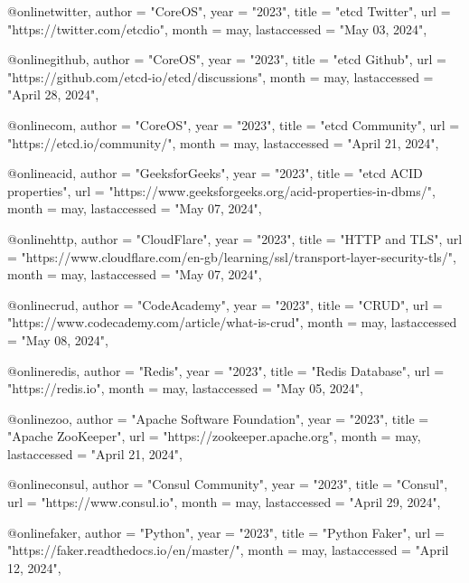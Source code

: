 @online{twitter,
  author =       "CoreOS",
  year =         "2023",
  title =        "etcd Twitter",
  url =          "https://twitter.com/etcdio",
  month =        may,
  lastaccessed = "May 03, 2024",
}

@online{github,
  author =       "CoreOS",
  year =         "2023",
  title =        "etcd Github",
  url =          "https://github.com/etcd-io/etcd/discussions",
  month =        may,
  lastaccessed = "April 28, 2024",
}

@online{com,
  author =       "CoreOS",
  year =         "2023",
  title =        "etcd Community",
  url =          "https://etcd.io/community/",
  month =        may,
  lastaccessed = "April 21, 2024",
}

@online{acid,
  author =       "GeeksforGeeks",
  year =         "2023",
  title =        "etcd ACID properties",
  url =          "https://www.geeksforgeeks.org/acid-properties-in-dbms/",
  month =        may,
  lastaccessed = "May 07, 2024",
}

@online{http,
  author =       "CloudFlare",
  year =         "2023",
  title =        "HTTP and TLS",
  url =          "https://www.cloudflare.com/en-gb/learning/ssl/transport-layer-security-tls/",
  month =        may,
  lastaccessed = "May 07, 2024",
}

@online{crud,
  author =       "CodeAcademy",
  year =         "2023",
  title =        "CRUD",
  url =          "https://www.codecademy.com/article/what-is-crud",
  month =        may,
  lastaccessed = "May 08, 2024",
}

@online{redis,
  author =       "Redis",
  year =         "2023",
  title =        "Redis Database",
  url =          "https://redis.io",
  month =        may,
  lastaccessed = "May 05, 2024",
}

@online{zoo,
  author =       "Apache Software Foundation",
  year =         "2023",
  title =        "Apache ZooKeeper",
  url =          "https://zookeeper.apache.org",
  month =        may,
  lastaccessed = "April 21, 2024",
}

@online{consul,
  author =       "Consul Community",
  year =         "2023",
  title =        "Consul",
  url =          "https://www.consul.io",
  month =        may,
  lastaccessed = "April 29, 2024",
}

@online{faker,
  author =       "Python",
  year =         "2023",
  title =        "Python Faker",
  url =          "https://faker.readthedocs.io/en/master/",
  month =        may,
  lastaccessed = "April 12, 2024",
}

